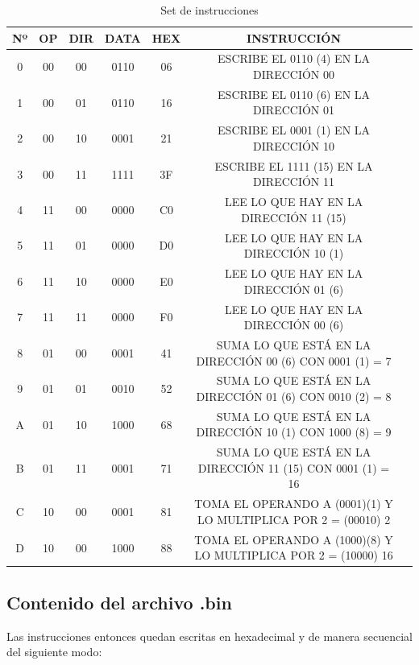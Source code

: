 \documentclass{sciposter}
\begin{document}
\begin{multicols*}{2}
\begin{table}[h]
    \centering
    \renewcommand{\arraystretch}{1.2}
    \begin{tabular}{|c|c|c|c|c|c|l|}
        \hline
        \textbf{Nº} & \textbf{OP} & \textbf{DIR} & \textbf{DATA} & \textbf{HEX} & \textbf{INSTRUCCIÓN} \\
        \hline
        0 & 00 & 00 & 0110 & 06 & ESCRIBE EL 0110 (4) EN LA DIRECCI\'ON 00 \\
        1 & 00 & 01 & 0110 & 16 & ESCRIBE EL 0110 (6) EN LA DIRECCI\'ON 01 \\
        2 & 00 & 10 & 0001 & 21 & ESCRIBE EL 0001 (1) EN LA DIRECCI\'ON 10 \\
        3 & 00 & 11 & 1111 & 3F & ESCRIBE EL 1111 (15) EN LA DIRECCI\'ON 11 \\
        4 & 11 & 00 & 0000 & C0 & LEE LO QUE HAY EN LA DIRECCI\'ON 11 (15) \\
        5 & 11 & 01 & 0000 & D0 & LEE LO QUE HAY EN LA DIRECCI\'ON 10 (1) \\
        6 & 11 & 10 & 0000 & E0 & LEE LO QUE HAY EN LA DIRECCI\'ON 01 (6) \\
        7 & 11 & 11 & 0000 & F0 & LEE LO QUE HAY EN LA DIRECCI\'ON 00 (6) \\
        8 & 01 & 00 & 0001 & 41 & SUMA LO QUE EST\'A EN LA DIRECCI\'ON 00 (6) CON 0001 (1) = 7 \\
        9 & 01 & 01 & 0010 & 52 & SUMA LO QUE EST\'A EN LA DIRECCI\'ON 01 (6) CON 0010 (2) = 8 \\
        A & 01 & 10 & 1000 & 68 & SUMA LO QUE EST\'A EN LA DIRECCI\'ON 10 (1) CON 1000 (8) = 9 \\
        B & 01 & 11 & 0001 & 71 & SUMA LO QUE EST\'A EN LA DIRECCI\'ON 11 (15) CON 0001 (1) = 16\\
        C & 10 & 00 & 0001 & 81 & TOMA EL OPERANDO A (0001)(1) Y LO MULTIPLICA POR 2 = (00010) 2 \\
        D & 10 & 00 & 1000 & 88 & TOMA EL OPERANDO A (1000)(8) Y LO MULTIPLICA POR 2 = (10000) 16 \\
        \hline
    \end{tabular}
    \caption{Set de instrucciones}
    \label{tab:instrucciones}
\end{table}

\subsection{Contenido del archivo .bin}
Las instrucciones entonces quedan escritas en hexadecimal y de manera secuencial del siguiente modo:


\end{multicols*}
\end{document}
